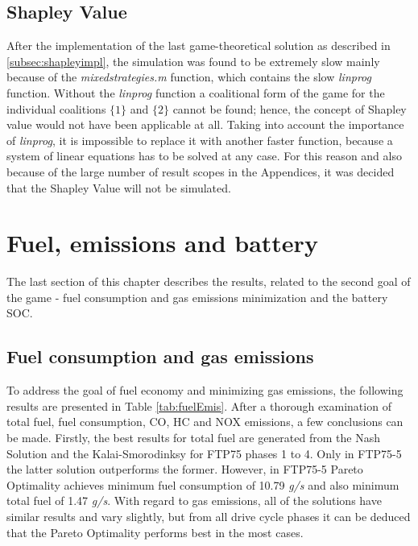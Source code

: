 \subsection{Shapley Value}
After the implementation of the last game-theoretical solution as described in \ref{subsec:shapleyimpl}, the simulation was found to be extremely slow mainly because of the \textit{mixedstrategies.m} function, which contains the slow \textit{linprog} function. Without the \textit{linprog} function a coalitional form of the game for the individual coalitions $\{1\}$ and $\{2\}$ cannot be found; hence, the concept of Shapley value would not have been applicable at all. Taking into account the importance of \textit{linprog}, it is impossible to replace it with another faster function, because a system of linear equations has to be solved at any case. For this reason and also because of the large number of result scopes in the Appendices, it was decided that the Shapley Value will not be simulated.

\section{Fuel, emissions and battery}
\label{sec:goalresults}
The last section of this chapter describes the results, related to the second goal of the game - fuel consumption and gas emissions minimization and the battery SOC.

\subsection{Fuel consumption and gas emissions}
To address the goal of fuel economy and minimizing gas emissions, the following results are presented in Table \ref{tab:fuelEmis}. After a thorough examination of total fuel, fuel consumption, CO, HC and NOX emissions, a few conclusions can be made. Firstly, the best results for total fuel are generated from the Nash Solution and the Kalai-Smorodinksy for FTP75 phases 1 to 4. Only in FTP75-5 the latter solution outperforms the former. However, in FTP75-5 Pareto Optimality achieves minimum fuel consumption of 10.79 \textit{g/s} and also minimum total fuel of 1.47 \textit{g/s}. With regard to gas emissions, all of the solutions have similar results and vary slightly, but from all drive cycle phases it can be deduced that the Pareto Optimality performs best in the most cases.

